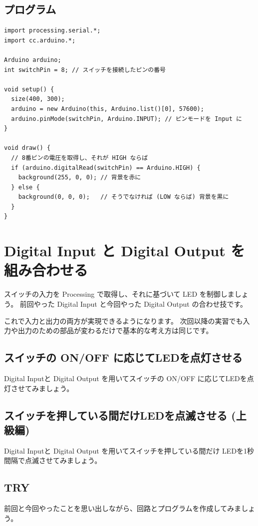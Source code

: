 \documentclass[11pt,a4paper]{jarticle}
\begin{document}
\subsection{プログラム}
\begin{lstlisting}
import processing.serial.*;
import cc.arduino.*;

Arduino arduino;
int switchPin = 8; // スイッチを接続したピンの番号
 
void setup() {
  size(400, 300);
  arduino = new Arduino(this, Arduino.list()[0], 57600);
  arduino.pinMode(switchPin, Arduino.INPUT); // ピンモードを Input に
}
 
void draw() {
  // 8番ピンの電圧を取得し、それが HIGH ならば
  if (arduino.digitalRead(switchPin) == Arduino.HIGH) {
    background(255, 0, 0); // 背景を赤に
  } else {
    background(0, 0, 0);   // そうでなければ (LOW ならば) 背景を黒に
  }
}
\end{lstlisting}

\section{Digital Input と Digital Output を組み合わせる}
スイッチの入力を Processing で取得し、それに基づいて LED を制御しましょう。
前回やった Digital Input と今回やった Digital Output の合わせ技です。

これで入力と出力の両方が実現できるようになります。
次回以降の実習でも入力や出力のための部品が変わるだけで基本的な考え方は同じです。

\subsection{スイッチの ON/OFF に応じてLEDを点灯させる}
Digital Inputと Digital Output を用いてスイッチの ON/OFF に応じてLEDを点灯させてみましょう。

\subsection{スイッチを押している間だけLEDを点滅させる (上級編) }
Digital Inputと Digital Output を用いてスイッチを押している間だけ LEDを1秒間隔で点滅させてみましょう。

\subsection*{TRY}
前回と今回やったことを思い出しながら、回路とプログラムを作成してみましょう。
\end{document}
